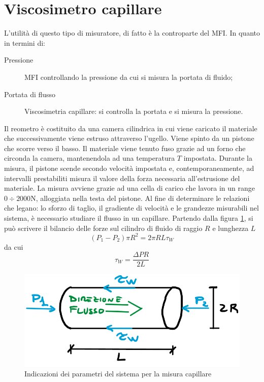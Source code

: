 \section{Viscosimetro capillare}
L'utilità di questo tipo di misuratore, di fatto è la controparte del \ac{MFI}.
In quanto in termini di:
\begin{description}
\item[Pressione] \ac{MFI} controllando la pressione da cui si misura la portata di fluido;
\item[Portata di flusso] Viscosimetria capillare: si controlla la portata e si misura la pressione.
\end{description}

Il reometro è costituito da una camera cilindrica in cui viene caricato il materiale che successivamente viene estruso attraverso l'ugello. Viene spinto da un pistone che scorre verso il basso.
Il materiale viene tenuto fuso grazie ad un forno che circonda la camera, mantenendola ad una temperatura $T$ impostata.
Durante la misura, il pistone scende secondo velocità impostata e, contemporaneamente, ad intervalli prestabiliti misura il valore della forza necessaria all'estrusione del materiale.
La misura avviene grazie ad una cella di carico che lavora in un range $0 \div 2000\unit{\N}$, alloggiata nella testa del pistone.
Al fine di determinare le relazioni che legano: lo sforzo di taglio, il gradiente di velocità e le grandezze misurabili nel sistema, è necessario studiare il flusso in un capillare.
Partendo dalla figura \ref{fig:Capillare}, si può scrivere il bilancio delle forze sul cilindro di fluido di raggio $R$ e lunghezza $L$
\begin{equation}
(P_1 - P_2)\pi R^2 = 2\pi RL \tau_W
\end{equation}
da cui
\begin{equation}
\tau_W = \frac{\Delta P R}{2 L}
\end{equation}

\begin{figure}
\centering
\includegraphics[width = \textwidth]{gfx/Capillare}
\caption{Indicazioni dei parametri del sistema per la misura capillare}
\label{fig:Capillare}
\end{figure}

